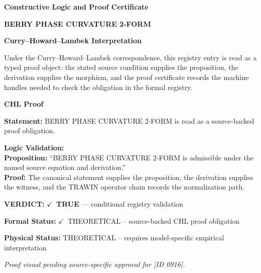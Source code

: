 \clearpage
\begingroup\tzpsupportsetup
\noindent\textbf{\fontsize{10.8pt}{12.8pt}\selectfont [ID 0916] Constructive Logic and Proof Certificate}\par
\noindent\textbf{\fontsize{10pt}{12pt}\selectfont BERRY PHASE CURVATURE 2-FORM}\par
\vspace{0.45em}
\begingroup
\footnotesize
\setlength{\parskip}{0.22em}
\setlength{\parindent}{0pt}
\noindent\textbf{Curry--Howard--Lambek Interpretation}\par
Under the Curry--Howard--Lambek correspondence, this registry entry is read as a typed proof
object: the stated source condition supplies the proposition, the derivation supplies the
morphism, and the proof certificate records the machine handles needed to check the obligation
in the formal registry.

\vspace{0.45em}
\noindent\textbf{CHL Proof}\par
\textbf{Statement:} BERRY PHASE CURVATURE 2-FORM is read as a source-backed proof obligation.

\textbf{Logic Validation:}\\
\textbf{Proposition:} ``BERRY PHASE CURVATURE 2-FORM is admissible under the named source equation and derivation.''\\
\textbf{Proof:} The canonical statement supplies the proposition, the derivation supplies the witness, and the TRAWIN operator chain records the normalization path.

\textbf{VERDICT:} \ensuremath{\checkmark}\ \textbf{TRUE} --- conditional registry validation

\textbf{Formal Status:} \ensuremath{\checkmark}\ THEORETICAL -- source-backed CHL proof obligation

\textbf{Physical Status:} THEORETICAL -- requires model-specific empirical interpretation
\par\vspace{0.45em}
\par
\vfill
\begingroup\footnotesize\itshape
Proof visual pending source-specific approval for [ID 0916].
\par\endgroup
\vfill
\endgroup
\endgroup
